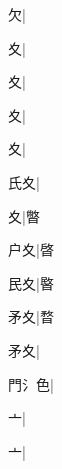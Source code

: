 \begin{multicols}{2}
{{欠}\mktsJzrVerticalBar{}{\cjk{}{\cnsym{}　}{\cnsym{}　}{\cnsym{}　}}|{}\par
{\cjk{}{\cnsym{}　}{\cnsym{}　}夊}\mktsJzrVerticalBar{}{\cjk{}{\cnsym{}　}{\cnsym{}　}{\cnsym{}　}}|{}\par
{夊}\mktsJzrVerticalBar{}{\cjk{}{\cnsym{}　}{\cnsym{}　}{\cnsym{}　}}|{}\par
{夊}\mktsJzrVerticalBar{}{\cjk{}{\cnsym{}　}{\cnsym{}　}{\cnsym{}　}}|{}\par
{夊}\mktsJzrVerticalBar{}{\cjk{}{\cnsym{}　}{\cnsym{}　}{\cnsym{}　}}|{}\par
{\cjk{}{\cnsym{}　}氏夊}\mktsJzrVerticalBar{}{\cjk{}{\cnsym{}　}{\cnsym{}　}{\cnsym{}　}}|{}\par
{夊}\mktsJzrVerticalBar{}{\cjk{}{\cnsym{}　}{\cnsym{}　}{\cnsym{}　}}|{\cjk{}暼}\par
{\cjk{}{\cnsym{}　}户夊}\mktsJzrVerticalBar{}{\cjk{}{\cnsym{}　}{\cnsym{}　}{\cnsym{}　}}|{\cjk{}晵}\par
{\cjk{}{\cnsym{}　}民夊}\mktsJzrVerticalBar{}{\cjk{}{\cnsym{}　}{\cnsym{}　}{\cnsym{}　}}|{\cjk{}暋}\par
{\cjk{}{\cnsym{}　}矛夊}\mktsJzrVerticalBar{}{\cjk{}{\cnsym{}　}{\cnsym{}　}{\cnsym{}　}}|{\cjk{}暓}\par
{矛夊}\mktsJzrVerticalBar{}{\cjk{}{\cnsym{}　}{\cnsym{}　}{\cnsym{}　}}|{}\par
{\cjk{}門{\cnxHanaA{}氵}色}\mktsJzrVerticalBar{}{\cjk{}{\cnsym{}　}{\cnsym{}　}{\cnsym{}　}}|{}\par
{\cjk{}{\cnsym{}　}{\cnsym{}　}亠}\mktsJzrVerticalBar{}{\cjk{}{\cnsym{}　}{\cnsym{}　}{\cnsym{}　}}|{}\par
{亠}\mktsJzrVerticalBar{}{\cjk{}{\cnsym{}　}{\cnsym{}　}{\cnsym{}　}}|{}\par
}
\end{multicols}
